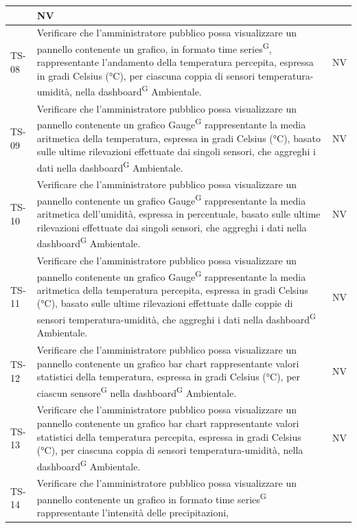 \documentclass[8pt]{article}
\newcommand{\glossterm}[1]{#1\textsuperscript{G}} %
\begin{document}
\begin{longtable}{|>{\centering}p{2cm}|>{\RaggedRight}m{12cm}|>{\centering\arraybackslash}p{2cm}|}
    & NV \\
    \hline 
    TS-08 & Verificare che l'amministratore pubblico possa visualizzare un pannello
    contenente un grafico, in formato \glossterm{time series}, rappresentante l'andamento della temperatura
    percepita,
    espressa in gradi Celsius (°C), per ciascuna coppia di sensori temperatura-umidità, nella
    \glossterm{dashboard} Ambientale.
    & NV \\
    \hline
    TS-09 & Verificare che l'amministratore pubblico possa visualizzare un pannello contenente
    un grafico \glossterm{Gauge} rappresentante la media aritmetica della temperatura,
    espressa in gradi Celsius (°C), basato sulle ultime rilevazioni effettuate dai singoli sensori, che aggreghi i dati nella \glossterm{dashboard} Ambientale.
    & NV \\
    \hline
    TS-10 & Verificare che l'amministratore pubblico possa visualizzare un pannello contenente
    un grafico \glossterm{Gauge} rappresentante la media aritmetica dell'umidità,
    espressa in percentuale, basato sulle ultime rilevazioni effettuate dai singoli sensori, che aggreghi i dati nella \glossterm{dashboard} Ambientale.
    & NV \\
    \hline
    TS-11 & Verificare che l'amministratore pubblico possa visualizzare un pannello contenente
    un grafico \glossterm{Gauge} rappresentante la media aritmetica della temperatura percepita,
    espressa in gradi Celsius (°C), basato sulle ultime rilevazioni effettuate dalle coppie di sensori temperatura-umidità, che aggreghi i dati nella \glossterm{dashboard} Ambientale.
    & NV \\
    \hline
    TS-12 & Verificare che l'amministratore pubblico possa visualizzare un pannello contenente
    un grafico bar chart rappresentante valori statistici della temperatura,
    espressa in gradi Celsius (°C), per ciascun \glossterm{sensore} nella \glossterm{dashboard} Ambientale.
    & NV \\
    \hline
    TS-13 & Verificare che l'amministratore pubblico possa visualizzare un pannello contenente
    un grafico bar chart rappresentante valori statistici della temperatura percepita,
    espressa in gradi Celsius (°C), per ciascuna coppia di sensori temperatura-umidità, nella \glossterm{dashboard} Ambientale.
    & NV \\
    \hline
    TS-14 & Verificare che l'amministratore pubblico possa visualizzare un pannello contenente
    un grafico in formato \glossterm{time series} rappresentante l'intensità delle precipitazioni,

\end{longtable}
\end{document}
